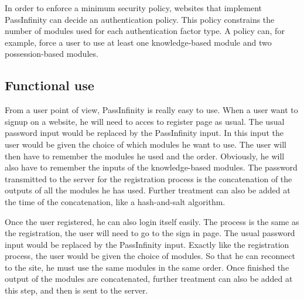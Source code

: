 \documentclass[twocolumn,14pt]{extarticle}
\begin{document}
In order to enforce a minimum security policy, websites that implement PassInfinity can decide an authentication policy. This policy constrains the number of modules used for each authentication factor type. A policy can, for example, force a user to use at least one knowledge-based module and two possession-based modules.

\subsection{Functional use}
From a user point of view, PassInfinity is really easy to use. When a user want to signup on a website, he will need to acces to register page as usual. The usual password input would be replaced by the PassInfinity input. In this input the user would be given the choice of which modules he want to use. The user will then have to remember the modules he used and the order. Obviously, he will also have to remember the inputs of the knowledge-based modules. The password transmitted to the server for the registration process is the concatenation of the outputs of all the modules he has used. Further treatment can also be added at the time of the concatenation, like a hash-and-salt algorithm.

Once the user registered, he can also login itself easily. The process is the same as the registration, the user will need to go to the sign in page. The usual password input would be replaced by the PassInfinity input. Exactly like the registration process, the user would be given the choice of modules. So that he can reconnect to the site, he must use the same modules in the same order. Once finished the output of the modules are concatenated, further treatment can also be added at this step, and then is sent to the server.
\end{document}
